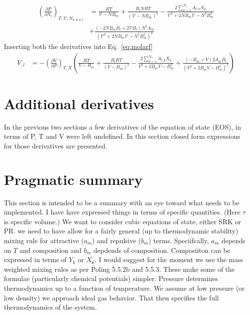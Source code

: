 \documentclass[11pt]{article}
\begin{document}
     \begin{align}
     \left(\frac{\partial P}{\partial N_{l}} \right)_{T,\mathcal{V},N_{k,k\neq l}} &= \frac{R T}{\mathcal{V}- N B_{m}} + \frac{B_l N R T}{\left(\mathcal{V}-N B_m\right)^2} - \frac{2 \sum_{k=1}^{N_{s}} A_{l,k} N_{k}}{\mathcal{V}^2+ 2 N B_{m} \mathcal{V} - N^2 B_m^2}  \nonumber \\
 &+ \frac{\left(-2N B_m B_l + 2\mathcal{V} B_l\right)N^2 A_m}{\left(\mathcal{V}^2+ 2 N B_{m} \mathcal{V} - N^2 B_m^2 \right)^2}
     \end{align}
    Inserting both the derivatives into Eq.~\ref{eq:molarf}
    \begin{align}
    V_{,l} &= -\left(\frac{\partial V}{\partial P}\right)_{T,X} \left(\frac{R T}{V- B_{m}} + \frac{B_l R T}{\left(V-B_m\right)^2} - \frac{2 \sum_{k=1}^{N_{s}} A_{l,k} X_{k}}{V^2+ 2 B_{m} V - B_m^2} + \frac{\left(-B_m + V\right) 2 A_m B_l}{\left(V^2+ 2 B_{m} V - B_m^2 \right)^2} \right)
    \end{align}
     \section{Additional derivatives}
     In the previous two sections a few derivatives of the equation of state (EOS), in terms of P, T and V were left undefined. In this section closed form expressions for those derivatives are presented. 
     
\section{Pragmatic summary}
\label{sec:john_summ}

This section is intended to be a summary with an eye toward what needs to be implemented.  I have
have expressed things in terms of specific quantities. (Here $\tau$ is specific volume.)
We want to consider cubic equations of state, either SRK or PR.  we need to have allow for a
fairly general (up to thermodynamic stability) mixing rule for attractive ($a_m$) and repulsive ($b_m$)
terms.  Speciifcally, $a_m$ depends on $T$ and composition and $b_m$ depdends of composition.  Composiiton
can be expressed in terms of $Y_k$ or $X_k$.  I would suggest for the moment we use the mass weighted
mixing rules as per Poling 5.5.2b and 5.5.3.  These make some of the formulae (particularly chemical
potentials) simpler.   Pressure determines thermodynamics
up to a function of temperature.  
We assume at low pressure (or low density) we approach ideal gas behavior.  That then specifies
the full thermodynamics of the system.
\end{document}

